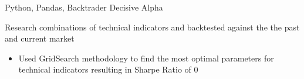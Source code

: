 \begin{cventries}
        \cventry
    {Python, Pandas, Backtrader} %
    {Decisive Alpha} %
    {}
    {}
    {
      \begin{cvitems} %
        \item[] {Research combinations of technical indicators and backtested against the the past and current market}
        \begin{itemize}
            \item {Used GridSearch methodology to find the most optimal parameters for technical indicators resulting in Sharpe Ratio of 0}
        \end{itemize}        
      \end{cvitems}
    }

\end{cventries}
